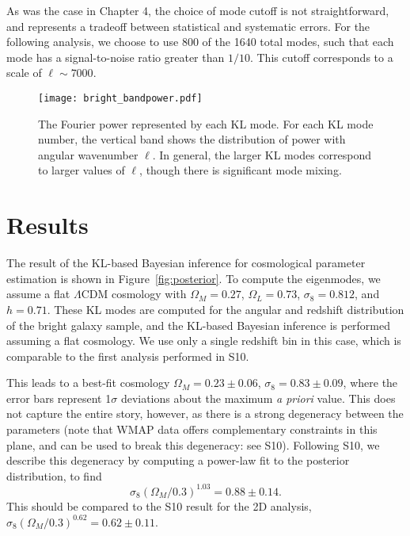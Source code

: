 As was the case in Chapter 4, the choice of mode cutoff is not straightforward,
and represents a tradeoff between statistical and systematic errors.  For the
following analysis, we choose to use 800 of the 1640 total modes, such that
each mode has a signal-to-noise ratio greater than $1/10$.  This cutoff
corresponds to a scale of $\ell \sim 7000$.

\begin{figure*}
 \centering
 \texttt{[image: bright\_bandpower.pdf]}
 \caption{
   The Fourier power represented by each KL mode.  For each KL mode number,
   the vertical band shows the distribution of power with angular wavenumber
   $\ell$.  In general, the larger KL modes correspond to larger values of
   $\ell$, though there is significant mode mixing.
   \label{fig:bandpower_masked}}
\end{figure*}

\section{Results}
\label{sec:results}

The result of the KL-based Bayesian inference for cosmological parameter
estimation is shown in Figure~\ref{fig:posterior}.  To compute the
eigenmodes, we assume a flat $\Lambda$CDM cosmology with
$\Omega_M = 0.27$, $\Omega_L = 0.73$, $\sigma_8 = 0.812$, and $h=0.71$.
These KL modes are computed for the angular and redshift distribution
of the bright galaxy sample, and the KL-based Bayesian inference is
performed assuming a flat cosmology.  We use only a single redshift bin in
this case, which is comparable to the first analysis performed in
S10.

This leads to a best-fit cosmology $\Omega_M = 0.23 \pm 0.06$,
$\sigma_8 = 0.83 \pm 0.09$, where the error bars represent 1$\sigma$
deviations about the maximum {\it a priori} value.
This does not capture the entire story, however, as there
is a strong degeneracy between the parameters (note that WMAP data offers
complementary constraints in this plane, and can be used to break this
degeneracy: see S10).  Following S10, we describe this degeneracy by
computing a power-law fit to the posterior distribution, to find
\begin{equation}
  \sigma_8 (\Omega_M / 0.3) ^ {1.03} = 0.88 \pm 0.14.
\end{equation}
This should be compared to the S10 result for the 2D analysis,
$\sigma_8 (\Omega_M / 0.3) ^ {0.62} = 0.62 \pm 0.11$.

